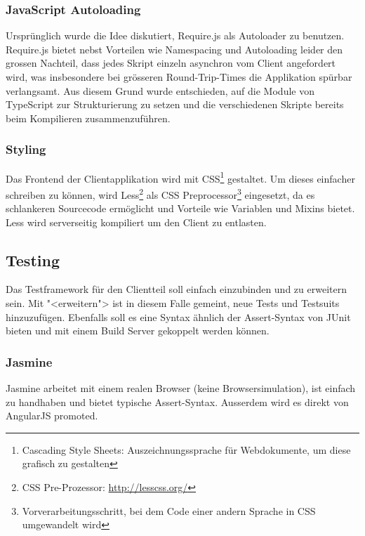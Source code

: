 			
			\subsubsection{JavaScript Autoloading}
				Ursprünglich wurde die Idee diskutiert, Require.js als Autoloader zu benutzen.
				Require.js bietet nebst Vorteilen wie Namespacing und Autoloading leider den grossen Nachteil,
				dass jedes Skript einzeln asynchron vom Client angefordert wird, 
				was insbesondere bei grösseren Round-Trip-Times die Applikation spürbar verlangsamt.
				Aus diesem Grund wurde entschieden, 
				auf die Module von TypeScript zur Strukturierung zu setzen  
				und die verschiedenen Skripte bereits beim Kompilieren zusammenzuführen.
				

			\subsubsection{Styling}
				Das Frontend der Clientapplikation wird mit CSS\footnote{Cascading Style Sheets: Auszeichnungssprache für Webdokumente, um diese grafisch zu gestalten} gestaltet.
				Um dieses einfacher schreiben zu können,
				wird Less\footnote{CSS Pre-Prozessor: \url{http://lesscss.org/}} als CSS Preprocessor\footnote{Vorverarbeitungsschritt, 
				bei dem Code einer andern Sprache in CSS umgewandelt wird} eingesetzt, 
				da es schlankeren Sourcecode ermöglicht und Vorteile wie Variablen und Mixins bietet.
				Less wird serverseitig kompiliert um den Client zu entlasten.
				
				
		\subsection{Testing}
			Das Testframework für den Clientteil soll einfach einzubinden und zu erweitern sein. 
			Mit "<erweitern"> ist in diesem Falle gemeint, neue Tests und Testsuits hinzuzufügen.
			Ebenfalls soll es eine Syntax ähnlich der Assert-Syntax von JUnit bieten und mit einem Build Server gekoppelt werden können.
			

			\subsubsection{Jasmine}
				Jasmine arbeitet mit einem realen Browser (keine Browsersimulation), 
				ist einfach zu handhaben und bietet typische Assert-Syntax.
				Ausserdem wird es direkt von AngularJS promoted.
				
				
